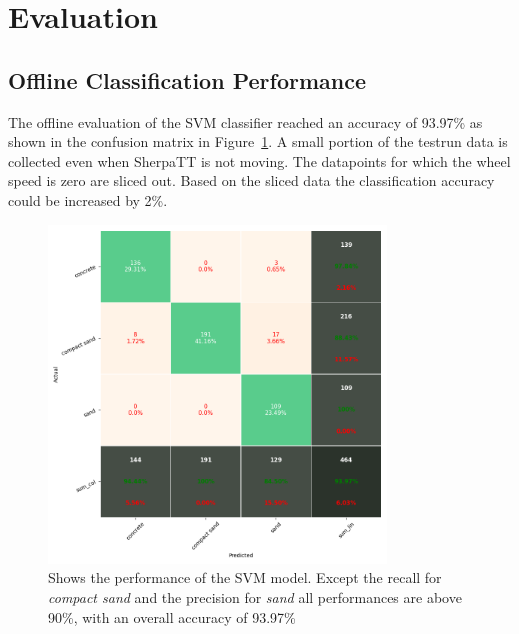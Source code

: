 \documentclass{article}
\begin{document}
\section{Evaluation}
\subsection{Offline Classification Performance}

The offline evaluation of the SVM classifier reached an accuracy of 93.97\% as shown in the confusion matrix in Figure~\ref{fig:confusionmatrix}. A small portion of the testrun data is collected even when SherpaTT is not moving. The datapoints for which the wheel speed is zero are sliced out. Based on the sliced data  the classification accuracy could be increased by 2\%.

\begin{figure}[h]
\centering
\includegraphics[width=0.8\textwidth]{../figures/confusionmatrix_Train.png}
\caption{\label{fig:confusionmatrix} Shows the performance of the SVM model. Except the recall for \emph{compact sand} and the precision for \emph{sand} all performances are above 90\%, with an overall accuracy of 93.97\%}
\end{figure}
\end{document}
